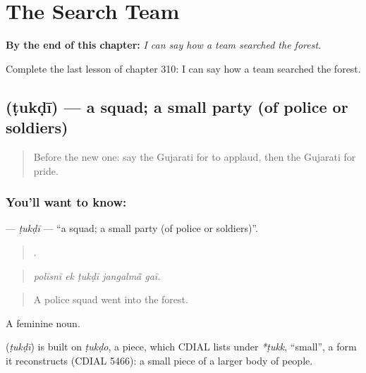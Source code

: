 
\chapter{The Search Team}
\label{ch:gu-the-search-team}

\begin{chapteropening}
\textbf{By the end of this chapter:} \emph{I can say how a team searched the forest.}

Complete the last lesson of chapter 310: I can say how a team searched the forest.
\end{chapteropening}

\section[\texorpdfstring{\gu{ટુકડી} (ṭukḍī)}{ટુકડી (ṭukḍī)}]{ (ṭukḍī) — a squad; a small party (of police or soldiers)}

\label{lesson:GU-C310-tukdi}



\begin{quote}
Before the new one: say the Gujarati for to applaud, then the Gujarati for pride.
\end{quote}

\subsection*{You'll want to know: }
\textbf{} — \emph{ṭukḍī} — \textquotedblleft{}a squad; a small party (of police or soldiers)\textquotedblright{}.

\begin{quote}
    .
\end{quote}

\begin{quote}
\emph{polīsnī ek ṭukḍī jangalmā̃ gaī.}
\end{quote}

\begin{quote}
A police squad went into the forest.
\end{quote}

A feminine noun.

\begin{cousinweb}
\textbf{} (\emph{ṭukḍī}) is built on \emph{ṭukḍo}, a piece, which CDIAL lists under \emph{*ṭukk}, \textquotedblleft{}small\textquotedblright{}, a form it reconstructs (CDIAL 5466): a small piece of a larger body of people.
\end{cousinweb}

